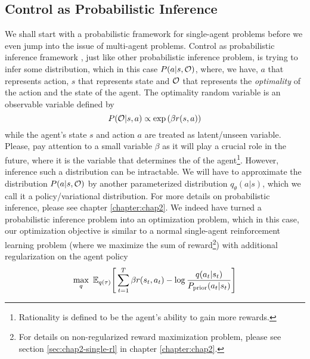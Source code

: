 \subsection{Control as Probabilistic Inference}
\label{sec:chap1-MERL-intro}
We shall start with a probabilistic framework for single-agent problems before we even jump into the issue of multi-agent problems. Control as probabilistic inference framework \cite{levine2018reinforcement, ziebart2008maximum}, just like other probabilistic inference problem, is trying to infer some distribution, which in this case $P(a | s, \mathcal{O})$, where, we have, $a$ that represents action, $s$ that represents state and $\mathcal{O}$ that represents the \textit{optimality} of the action and the state of the agent. The optimality random variable is an observable variable defined by 
\begin{equation}
    P(\mathcal{O} | s, a) \propto \exp\left( \beta r(s, a) \right)
\end{equation}
while the agent's state $s$ and action $a$ are treated as latent/unseen variable. Please, pay attention to a small variable $\beta$ as it will play a crucial role in the future, where it is the variable that determines the  of the agent\footnote{Rationality is defined to be the agent's ability to gain more rewards.}. However, inference such a distribution can be intractable. We will have to approximate the distribution $P(a | s, \mathcal{O})$ by another parameterized distribution $q_\theta(a | s)$, which we call it a policy/variational distribution. For more details on probabilistic inference, please see chapter \ref{chapter:chap2}. We indeed have turned a probabilistic inference problem into an optimization problem, which in this case, our optimization objective is similar to a normal single-agent reinforcement learning problem (where we maximize the sum of reward\footnote{For details on non-regularized reward maximization problem, please see section \ref{sec:chap2-single-rl} in chapter \ref{chapter:chap2}.}) with additional regularization on the agent policy
\begin{equation}
\label{eqn:chap1-optim-objective}
    \max_q \ \mathbb{E}_{q(\tau)}\Bigg[\sum^T_{t=1} \beta r(s_t, a_t) - \log\frac{q(a_t | s_t)}{P_{\text{prior}}(a_t | s_t)} \Bigg]
\end{equation}
